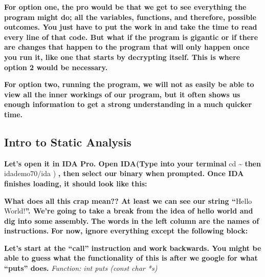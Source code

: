 \documentclass[letterpaper]{article}
\newcommand{\sitfig}[3]{
\begin{figure}[H]
\centering
\makebox[\textwidth][c]{
#2
}
\label{#1}
\end{figure}
}
\newcommand{\sitgfx}[4][scale=1.0]{
\sitfig{#3}{\texttt{[image: \#2]}}{#4}
}
\begin{document}
\textbf{For option one, the pro would be that we get to see everything the program might do; all the variables,
functions, and therefore, possible outcomes. You just have to put the work in and take the time to read every line of
that code. But what if the program is gigantic or if there are changes that happen to the program that will only happen
once you run it, like one that starts by decrypting itself. This is where option 2 would be necessary. }

{\centering
\textbf{\newline
For option two, running the program, we will not as easily be able to view all the inner workings of our program, but it
often shows us enough information to get a strong understanding in a much quicker time. \newline
}}

\subsection{Intro to Static Analysis}

\textbf{Let's open it in IDA Pro. Open IDA(Type into your terminal }cd \~{} \textbf{then }idademo70/ida )\textbf{ , then
select our binary when prompted. \newline
Once IDA finishes loading, it should look like this: }

{\centering   
\sitgfx[width=5.3957in,height=5.052in]{FINALWORKINGDOCFORMERLYPRECURSOR-img009.png}{fig:unk}{TODO CAPTION}
 \par}
\textbf{What does all this crap mean?? At least we can see our string ``}Hello World!\textbf{{}''. \newline
We're going to take a break from the idea of hello world and dig into some
}\textbf{\textcolor[rgb]{0.07450981,0.30980393,0.36078432}{assembly.}}\textbf{ The words in the left column are the
names of }\textbf{\textcolor[rgb]{0.21960784,0.4627451,0.11372549}{instructions.}}\textbf{ For now, ignore everything
except the following block:}

{\centering
\textbf{\newline
\newline
 }  
\sitgfx[width=4.8126in,height=1.0209in]{FINALWORKINGDOCFORMERLYPRECURSOR-img010.png}{fig:unk}{TODO CAPTION}
 
\par}

\textbf{Let's start at the ``call'' instruction and work backwards. You might be able to guess what the functionality of
this is after we google for what ``puts'' does.\newline
\newline
}\textit{Function: int puts (const char *s)}
\end{document}
